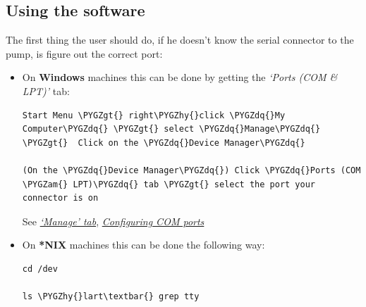 \documentclass[letterpaper,10pt,english]{sphinxmanual}
\def\PYGZam{\char`\&}
\def\PYGZgt{\char`\>}
\def\PYGZhy{\char`\-}
\def\PYGZdq{\char`\"}
\begin{document}
\subsection{Using the software}
\label{installation:using-the-software}
The first thing the user should do, if he doesn't know the serial connector
to the pump, is figure out the correct port:
\begin{itemize}
\item {} 
On \textbf{Windows} machines this can be done by getting the \emph{`Ports (COM \& LPT)'} tab:

\begin{Verbatim}[commandchars=\\\{\}]
Start Menu \PYGZgt{} right\PYGZhy{}click \PYGZdq{}My Computer\PYGZdq{} \PYGZgt{} select \PYGZdq{}Manage\PYGZdq{} \PYGZgt{}  Click on the \PYGZdq{}Device Manager\PYGZdq{}

(On the \PYGZdq{}Device Manager\PYGZdq{}) Click \PYGZdq{}Ports (COM \PYGZam{} LPT)\PYGZdq{} tab \PYGZgt{} select the port your connector is on
\end{Verbatim}

See {\hyperref[installation:finding-manage]{\emph{`Manage' tab}}}, {\hyperref[installation:finding-com-ports]{\emph{Configuring COM ports}}}

\item {} 
On \textbf{*NIX} machines this can be done the following way:

\begin{Verbatim}[commandchars=\\\{\}]
cd /dev

ls \PYGZhy{}lart\textbar{} grep tty
\end{Verbatim}

\end{itemize}
\end{document}

